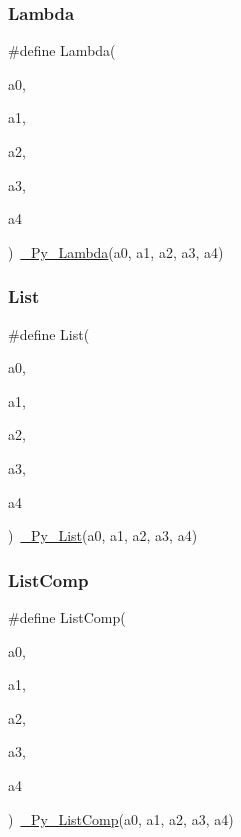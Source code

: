 \mbox{\label{_python-ast_8h_af3d84783a7fe3a1241ff0794313d29b9}} 
\subsubsection{\texorpdfstring{Lambda}{Lambda}}
{\footnotesize\ttfamily \#define Lambda(\begin{DoxyParamCaption}\item[{}]{a0,  }\item[{}]{a1,  }\item[{}]{a2,  }\item[{}]{a3,  }\item[{}]{a4 }\end{DoxyParamCaption})~\mbox{\hyperlink{_python-ast_8h_a445d98073909530cdb4b51f5c640baf5}{\+\_\+\+Py\+\_\+\+Lambda}}(a0, a1, a2, a3, a4)}

\mbox{\label{_python-ast_8h_a201830357d214aabbdb46b4163c792cf}} 
\subsubsection{\texorpdfstring{List}{List}}
{\footnotesize\ttfamily \#define List(\begin{DoxyParamCaption}\item[{}]{a0,  }\item[{}]{a1,  }\item[{}]{a2,  }\item[{}]{a3,  }\item[{}]{a4 }\end{DoxyParamCaption})~\mbox{\hyperlink{_python-ast_8h_a60f89e3a3bd0f6d993ddcc2c3a3eb9f0}{\+\_\+\+Py\+\_\+\+List}}(a0, a1, a2, a3, a4)}

\mbox{\label{_python-ast_8h_a436d129c9cca91b65e07a852cd5f61da}} 
\subsubsection{\texorpdfstring{ListComp}{ListComp}}
{\footnotesize\ttfamily \#define List\+Comp(\begin{DoxyParamCaption}\item[{}]{a0,  }\item[{}]{a1,  }\item[{}]{a2,  }\item[{}]{a3,  }\item[{}]{a4 }\end{DoxyParamCaption})~\mbox{\hyperlink{_python-ast_8h_ae1343d568a74770d89054de3b27a689e}{\+\_\+\+Py\+\_\+\+List\+Comp}}(a0, a1, a2, a3, a4)}

